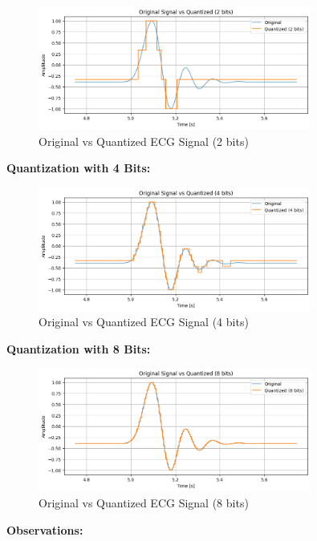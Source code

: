 \documentclass[10pt]{article}
\theoremstyle{definition}
\theoremstyle{remark}
\theoremstyle{definition}
\numberwithin{equation}{prob}
\begin{document}
\begin{figure}[H]
    \centering
    \includegraphics[width=0.8\textwidth]{./figures/ecg_quantized_2bit.png}
    \caption{Original vs Quantized ECG Signal (2 bits)}
\end{figure}

\textbf{Quantization with 4 Bits:}

\begin{figure}[H]
    \centering
    \includegraphics[width=0.8\textwidth]{./figures/ecg_quantized_4bit.png}
    \caption{Original vs Quantized ECG Signal (4 bits)}
\end{figure}

\textbf{Quantization with 8 Bits:}

\begin{figure}[H]
    \centering
    \includegraphics[width=0.8\textwidth]{./figures/ecg_quantized_8bit.png}
    \caption{Original vs Quantized ECG Signal (8 bits)}
\end{figure}

\textbf{Observations:}
\end{document}
